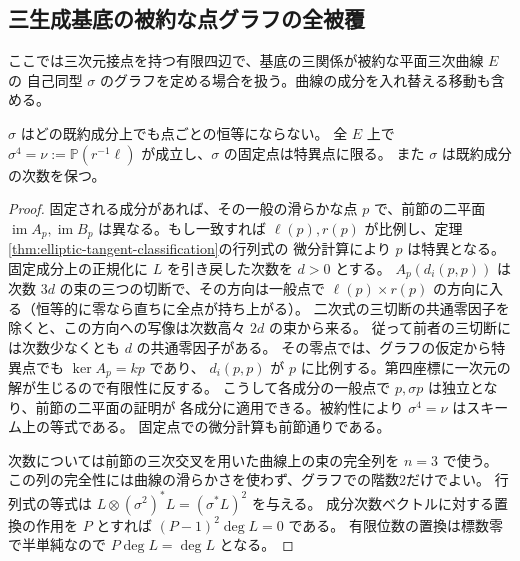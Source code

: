 \subsection{三生成基底の被約な点グラフの全被覆}
\label{sec:reduced-ternary-point-graphs}
ここでは三次元接点を持つ有限四辺で、基底の三関係が被約な平面三次曲線 $E$ の
自己同型 $\sigma$ のグラフを定める場合を扱う。曲線の成分を入れ替える移動も含める。

\begin{lemma}\label{lem:reduced-ternary-fourth-shift}
$\sigma$ はどの既約成分上でも点ごとの恒等にならない。
全 $E$ 上で $\sigma^4=\nu:=\mathbb P(r^{-1}\ell)$ が成立し、$\sigma$ の固定点は特異点に限る。
また $\sigma$ は既約成分の次数を保つ。
\end{lemma}
\begin{proof}
固定される成分があれば、その一般の滑らかな点 $p$ で、前節の二平面
$\operatorname{im} A_p,\operatorname{im} B_p$ は異なる。もし一致すれば
$\ell(p),r(p)$ が比例し、定理\ref{thm:elliptic-tangent-classification}の行列式の
微分計算により $p$ は特異となる。固定成分上の正規化に $L$ を引き戻した次数を $d>0$ とする。
$A_p(d_i(p,p))$ は次数 $3d$ の束の三つの切断で、その方向は一般点で
$\ell(p)\times r(p)$ の方向に入る（恒等的に零なら直ちに全点が持ち上がる）。
二次式の三切断の共通零因子を除くと、この方向への写像は次数高々 $2d$ の束から来る。
従って前者の三切断には次数少なくとも $d$ の共通零因子がある。
その零点では、グラフの仮定から特異点でも $\ker A_p=kp$ であり、
$d_i(p,p)$ が $p$ に比例する。第四座標に一次元の解が生じるので有限性に反する。
こうして各成分の一般点で $p,\sigma p$ は独立となり、前節の二平面の証明が
各成分に適用できる。被約性により $\sigma^4=\nu$ はスキーム上の等式である。
固定点での微分計算も前節通りである。

次数については前節の三次交叉を用いた曲線上の束の完全列を $n=3$ で使う。
この列の完全性には曲線の滑らかさを使わず、グラフでの階数2だけでよい。
行列式の等式は $L\otimes(\sigma^2)^*L=(\sigma^*L)^2$ を与える。
成分次数ベクトルに対する置換の作用を $P$ とすれば $(P-1)^2\deg L=0$ である。
有限位数の置換は標数零で半単純なので $P\deg L=\deg L$ となる。
\end{proof}

